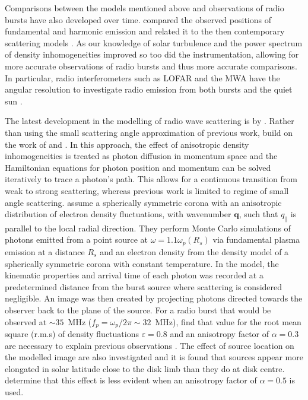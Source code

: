 Comparisons between the models mentioned above and observations of radio bursts have also developed over time. \cite{Stewart1972} compared the observed positions of fundamental and harmonic emission and related it to the then contemporary scattering models \citep[e.g.][]{Fokker1965,Steinberg1971}. As our knowledge of solar turbulence and the power spectrum of density inhomogeneities improved so too did the instrumentation, allowing for more accurate observations of radio bursts and thus more accurate comparisons. In particular, radio interferometers such as LOFAR and the MWA have the angular resolution to investigate radio emission from both bursts \citep[e.g.][]{Zhang2020} and the quiet sun \citep[e.g.][]{Sharma2020}. 

The latest development in the modelling of radio wave scattering is by \cite{Kontar2019}. Rather than using the small scattering angle approximation of previous work, \cite{Kontar2019} build on the work of \cite{Arzner1999} and \cite{Bian2019}. In this approach, the effect of anisotropic density inhomogeneities is treated as photon diffusion in momentum space and the Hamiltonian equations for photon position and momentum can be solved iteratively to trace a photon's path. This allows for a continuous transition from weak to strong scattering, whereas previous work is limited to regime of small angle scattering. \cite{Kontar2019} assume a spherically symmetric corona with an anisotropic distribution of electron density fluctuations, with wavenumber $\mathbf{q}$, such that $q_\parallel$ is parallel to the local radial direction. They perform Monte Carlo simulations of photons emitted from a point source at $\omega = 1.1 \omega_p(R_s)$ via fundamental plasma emission at a distance $R_s$ and an electron density from the \cite{Parker1960} density model of a spherically symmetric corona with constant temperature. In the \cite{Kontar2019} model, the kinematic properties and arrival time of each photon was recorded at a predetermined distance from the burst source where scattering is considered negligible. An image was then created by projecting photons directed towards the observer back to the plane of the source. For a radio burst that would be observed at $\sim 35$~MHz ($f_p = \omega_p/2 \pi \sim 32$~MHz), \cite{Kontar2019} find that value for the root mean square (r.m.s) of density fluctuations $\varepsilon = 0.8$ and an anisotropy factor of $\alpha = 0.3$ are necessary to explain previous observations \citep{Kontar2017}. The effect of source location on the modelled image are also investigated and it is found that sources appear more elongated in solar latitude close to the disk limb than they do at disk centre. \cite{Kontar2019} determine that this effect is less evident when an anisotropy factor of $\alpha = 0.5$ is used.

